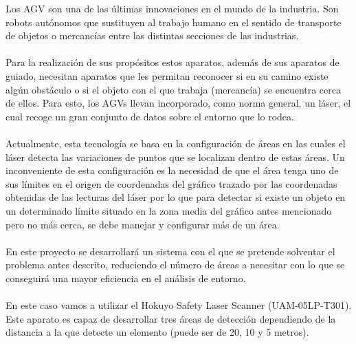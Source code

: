 Los AGV son una de las últimas innovaciones en el mundo de la industria. Son robots autónomos que sustituyen al trabajo humano en el sentido de transporte de objetos o mercancías entre las distintas secciones de las industrias. \\
\\
Para la realización de sus propósitos estos aparatos, además de sus aparatos de guiado, necesitan aparatos que les permitan reconocer si en su camino existe algún obstáculo o si el objeto con el que trabaja (mercancía) se encuentra cerca de ellos. Para esto, los AGVs llevan incorporado, como norma general, un láser, el cual recoge un gran conjunto de datos sobre el entorno que lo rodea.\\
\\
Actualmente, esta tecnología se basa en la configuración de áreas en las cuales el láser detecta las variaciones de puntos que se localizan dentro de estas áreas. Un inconveniente de esta configuración es la necesidad de que el área tenga uno de sus límites en el origen de coordenadas del gráfico trazado por las coordenadas obtenidas de las lecturas del láser por lo que para detectar si existe un objeto en un determinado límite situado en la zona media del gráfico antes mencionado pero no más cerca, se debe manejar y configurar más de un área.\\
\\
En este proyecto se desarrollará un sistema con el que se pretende solventar el problema antes descrito, reduciendo el número de áreas a necesitar con lo que se conseguirá una mayor eficiencia en el análisis de entorno.\\
\\
En este caso vamos a utilizar el Hokuyo Safety Laser Scanner (UAM-05LP-T301). Este aparato es capaz de desarrollar tres áreas de detección dependiendo de la distancia a la que detecte un elemento (puede ser de 20, 10 y 5 metros).\\